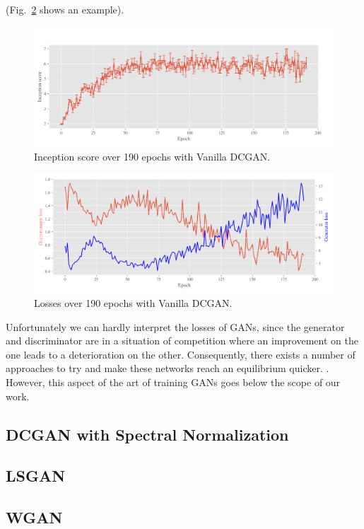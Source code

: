 (Fig.~\ref{fig:example} shows an example).

\begin{figure}
\centering
\includegraphics[width=\textwidth]{../code/results/figures/vanilla_gan_is.png}
\caption{Inception score over 190 epochs with Vanilla DCGAN.}
\label{fig:example}
\end{figure}


\begin{figure}
\centering
\includegraphics[width=\textwidth]{../code/results/figures/vanilla_gan_losses.png}
\caption{Losses over 190 epochs with Vanilla DCGAN.}
\label{fig:example}
\end{figure}
Unfortunately we can hardly interpret the losses of GANs, since the generator and discriminator are in a situation of competition where an improvement on the one leads to a deterioration on the other. Consequently, there exists a number of approaches to try and make these networks reach an equilibrium quicker. . However, this aspect of the art of training GANs goes below the scope of our work.

\subsection{DCGAN with Spectral Normalization}

\subsection{LSGAN}

\subsection{WGAN}